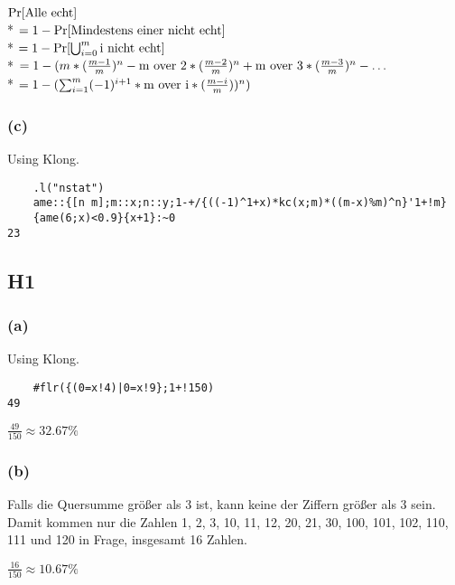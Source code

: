 \documentclass{article}
\begin{document}
$ \Pr[\hbox{Alle echt}] $ \\*
$ = 1-\Pr[\hbox{Mindestens einer nicht echt}] $ \\*
$ = 1-\Pr[\bigcup_{i=0}^{m} \hbox{i nicht echt}] $ \\*
$ = 1-(m*(\frac{m-1}{m})^n-\hbox{m over 2}*(\frac{m-2}{m})^n+\hbox{m over 3}*(\frac{m-3}{m})^n-\dots $ \\*
$ = 1-(\sum_{i=1}^{m}(-1)^{i+1}*\hbox{m over i}*(\frac{m-i}{m}))^n) $

\subsubsection*{(c)}

Using Klong.

\begin{lstlisting}
	.l("nstat")
	ame::{[n m];m::x;n::y;1-+/{((-1)^1+x)*kc(x;m)*((m-x)%m)^n}'1+!m}
	{ame(6;x)<0.9}{x+1}:~0
23
\end{lstlisting}

\subsection*{H1}

\subsubsection*{(a)}

Using Klong.

\begin{lstlisting}
	#flr({(0=x!4)|0=x!9};1+!150)
49
\end{lstlisting}

$\frac{49}{150} \approx 32.67\% $

\subsubsection*{(b)}

Falls die Quersumme größer als 3 ist, kann keine der Ziffern größer
als 3 sein. Damit kommen nur die Zahlen 1, 2, 3, 10, 11, 12, 20, 21,
30, 100, 101, 102, 110, 111 und 120 in Frage, insgesamt 16 Zahlen.

$\frac{16}{150} \approx 10.67\% $
\end{document}
